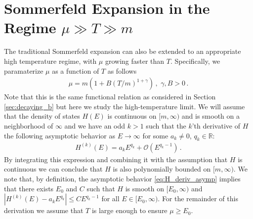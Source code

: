 \documentclass[sn-mathphys,Numbered]{sn-jnl}
\begin{document}
\section{Sommerfeld Expansion in the Regime $\mu\gg T\gg m$}\label{Section:HighTempSommerfeld}
The traditional Sommerfeld expansion can also be extended to an appropriate high temperature regime, with $\mu$ growing faster than $T$.  Specifically, we paramaterize $\mu$ as a function of $T$ as follows
\begin{align}\label{eq:mu_infinity_faster}
\mu=m(1+B(T/m)^{1+\gamma}) \,,\,\,\gamma,B>0\,.   
\end{align}
Note that this is the same functional relation as considered in Section \ref{sec:decaying_b} but here we study the high-temperature limit.  We will assume that the density of states $H(E)$ is continuous on $[m,\infty)$ and is smooth on a neighborhood of $\infty$ and we have an odd $k>1$ such that the $k$'th derivative of $H$ the following asymptotic behavior as $E\to\infty$ for some $a_k\neq 0$, $q_k\in\mathbb{R}$:
\begin{align}\label{eq:H_deriv_asymp}
    H^{(k)}(E)=a_kE^{q_k}+ \mathcal{O}(E^{q_k-1})\,.
\end{align}
By integrating this expression and combining it with the assumption that $H$ is continuous we can conclude that $H$ is also polynomially bounded on $[m,\infty)$. We note that, by definition, the asymptotic behavior \eqref{eq:H_deriv_asymp} implies that there exists $E_0$ and $C$ such that $H$ is smooth on $[E_0,\infty)$ and $|H^{(k)}(E)-a_kE^{q_k}|\leq CE^{q_k-1}$ for all $E\in[E_0,\infty)$. For the remainder of this derivation we assume that $T$ is large enough to ensure $\mu\geq E_0$. 
\end{document}
